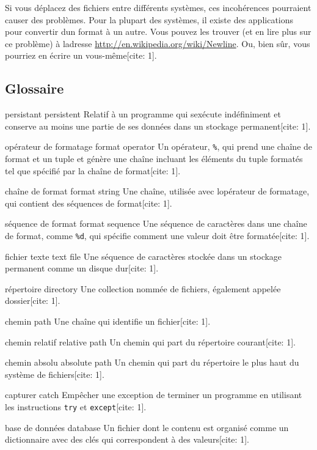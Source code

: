 Si vous déplacez des fichiers entre différents systèmes, ces
incohérences pourraient causer des problèmes. Pour la plupart des
systèmes, il existe des applications pour convertir d\textquotesingle un
format à un autre. Vous pouvez les trouver (et en lire plus sur ce
problème) à l\textquotesingle adresse
\url{http://en.wikipedia.org/wiki/Newline}. Ou, bien sûr, vous pourriez
en écrire un vous-même{[}cite: 1{]}.

\hypertarget{glossaire}{%
\subsection{Glossaire}\label{glossaire}}

persistant persistent Relatif à un programme qui
s\textquotesingle exécute indéfiniment et conserve au moins une partie
de ses données dans un stockage permanent{[}cite: 1{]}.

opérateur de formatage format operator Un opérateur, \texttt{\%}, qui
prend une chaîne de format et un tuple et génère une chaîne incluant les
éléments du tuple formatés tel que spécifié par la chaîne de
format{[}cite: 1{]}.

chaîne de format format string Une chaîne, utilisée avec
l\textquotesingle opérateur de formatage, qui contient des séquences de
format{[}cite: 1{]}.

séquence de format format sequence Une séquence de caractères dans une
chaîne de format, comme \texttt{\%d}, qui spécifie comment une valeur
doit être formatée{[}cite: 1{]}.

fichier texte text file Une séquence de caractères stockée dans un
stockage permanent comme un disque dur{[}cite: 1{]}.

répertoire directory Une collection nommée de fichiers, également
appelée dossier{[}cite: 1{]}.

chemin path Une chaîne qui identifie un fichier{[}cite: 1{]}.

chemin relatif relative path Un chemin qui part du répertoire
courant{[}cite: 1{]}.

chemin absolu absolute path Un chemin qui part du répertoire le plus
haut du système de fichiers{[}cite: 1{]}.

capturer catch Empêcher une exception de terminer un programme en
utilisant les instructions \texttt{try} et \texttt{except}{[}cite: 1{]}.

base de données database Un fichier dont le contenu est organisé comme
un dictionnaire avec des clés qui correspondent à des valeurs{[}cite:
1{]}.

